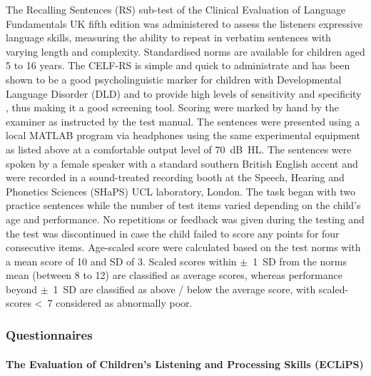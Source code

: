 \documentclass[a4paper, twoside]{templates/ociamthesis}
\begin{document}
\hfill\break
The Recalling Sentences (RS) sub-test of the Clinical Evaluation of Language Fundamentals UK fifth edition \autocite[CELF-5-UK][]{HWiig2017} was administered to assess the listeners expressive language skills, measuring the ability to repeat in verbatim sentences with varying length and complexity. Standardised norms are available for children aged 5 to 16 years. The CELF-RS is simple and quick to administrate and has been shown to be a good psycholinguistic marker for children with Developmental Language Disorder (DLD) and to provide high levels of sensitivity and specificity \autocite{Conti-Ramsden2001}, thus making it a good screening tool. Scoring were marked by hand by the examiner as instructed by the test manual. The sentences were presented using a local MATLAB program via headphones using the same experimental equipment as listed above at a comfortable output level of 70~dB~HL. The sentences were spoken by a female speaker with a standard southern British English accent and were recorded in a sound-treated recording booth at the Speech, Hearing and Phonetics Sciences (SHaPS) UCL laboratory, London. The task began with two practice sentences while the number of test items varied depending on the child's age and performance. No repetitions or feedback was given during the testing and the test was discontinued in case the child failed to score any points for four consecutive items. Age-scaled score were calculated based on the test norms with a mean score of 10 and SD of 3. Scaled scores within \(\pm\)~1~SD from the norms mean (between 8 to 12) are classified as average scores, whereas performance beyond \(\pm\)~1~SD are classified as above / below the average score, with scaled-scores \textless~7 considered as abnormally poor.\\

\hypertarget{questionnaires}{%
\subsubsection{Questionnaires}\label{questionnaires}}

\hypertarget{the-evaluation-of-childrens-listening-and-processing-skills-eclips}{%
\paragraph{The Evaluation of Children's Listening and Processing Skills (ECLiPS)}\label{the-evaluation-of-childrens-listening-and-processing-skills-eclips}}
\end{document}
